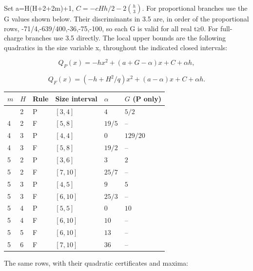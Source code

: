 \documentclass[
  10pt,
  a4paper,
]{article}
\begin{document}
Set a=H(H+2+2m)+1, \(C=-cHh/2-2\binom h3\). For proportional branches
use the G values shown below. Their discriminants in 3.5 are, in order
of the proportional rows, -71/4,-639/400,-36,-75,-100, so each G is
valid for all real t≥0. For full-charge branches use 3.5 directly. The
local upper bounds are the following quadratics in the size variable x,
throughout the indicated closed intervals:

\[Q_P(x)=-h x^2+(a+G-\alpha)x+C+\alpha h,\]

\[Q_F(x)=(-h+H^2/q)x^2+(a-\alpha)x+C+\alpha h.\]

\begin{longtable}[]{@{}llllll@{}}
\toprule\noalign{}
\(m\) & \(H\) & Rule & Size interval & \(\alpha\) & \(G\) (P only) \\
\midrule\noalign{}
\endhead
\bottomrule\noalign{}
\endlastfoot
4 & 2 & P & \([3,4]\) & \(4\) & \(5/2\) \\
4 & 2 & F & \([5,8]\) & \(19/5\) & -- \\
4 & 3 & P & \([4,4]\) & \(0\) & \(129/20\) \\
4 & 3 & F & \([5,8]\) & \(19/2\) & -- \\
5 & 2 & P & \([3,6]\) & \(3\) & \(2\) \\
5 & 2 & F & \([7,10]\) & \(25/7\) & -- \\
5 & 3 & P & \([4,5]\) & \(9\) & \(5\) \\
5 & 3 & F & \([6,10]\) & \(25/3\) & -- \\
5 & 4 & P & \([5,5]\) & \(0\) & \(10\) \\
5 & 4 & F & \([6,10]\) & \(10\) & -- \\
5 & 5 & F & \([6,10]\) & \(13\) & -- \\
5 & 6 & F & \([7,10]\) & \(36\) & -- \\
\end{longtable}

The same rows, with their quadratic certificates and maxima:
\end{document}
